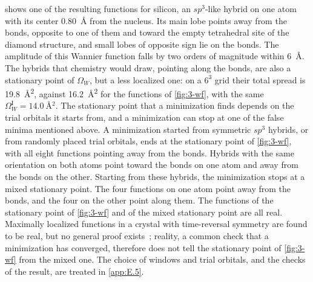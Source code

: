  shows one of the resulting functions for silicon, an $sp^3$-like hybrid on one atom with its center \SI{0.80}{\angstrom} from the nucleus. Its main lobe points away from the bonds, opposite to one of them and toward the empty tetrahedral site of the diamond structure, and small lobes of opposite sign lie on the bonds. The amplitude of this Wannier function falls by two orders of magnitude within \SI{6}{\angstrom}. The hybrids that chemistry would draw, pointing along the bonds, are also a stationary point of $\Omega_W$, but a less localized one: on a $6^3$ grid their total spread is \SI{19.8}{\angstrom^2}, against \SI{16.2}{\angstrom^2} for the functions of \cref{fig:3-wf}, with the same $\Omega_W^{\mathrm{I}} = \SI{14.0}{\angstrom^2}$. The stationary point that a minimization finds depends on the trial orbitals it starts from, and a minimization can stop at one of the false minima mentioned above. A minimization started from symmetric $sp^3$ hybrids, or from randomly placed trial orbitals, ends at the stationary point of \cref{fig:3-wf}, with all eight functions pointing away from the bonds. Hybrids with the same orientation on both atoms point toward the bonds on one atom and away from the bonds on the other. Starting from these hybrids, the minimization stops at a mixed stationary point. The four functions on one atom point away from the bonds, and the four on the other point along them. The functions of the stationary point of \cref{fig:3-wf} and of the mixed stationary point are all real. Maximally localized functions in a crystal with time-reversal symmetry are found to be real, but no general proof exists~\cite{marzari1997maximally}; reality, a common check that a minimization has converged, therefore does not tell the stationary point of \cref{fig:3-wf} from the mixed one. The choice of windows and trial orbitals, and the checks of the result, are treated in \cref{app:E.5}.

